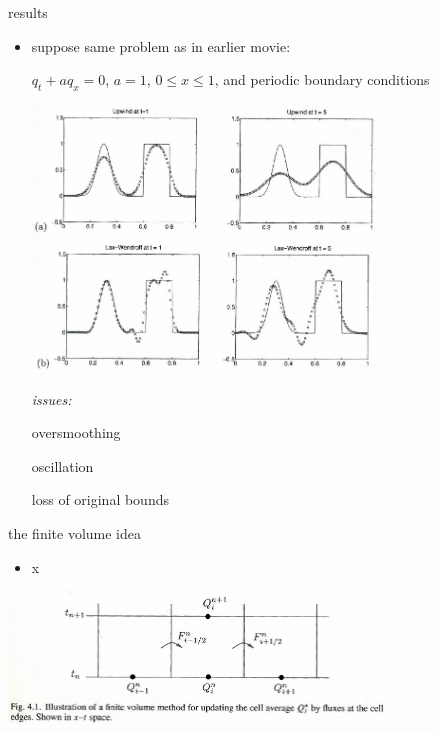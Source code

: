 \documentclass[10pt,hyperref]{beamer}
\begin{document}
\begin{frame}{results}

\begin{itemize}
\item suppose same problem as in earlier movie:

$q_t+a q_x=0$, $a=1$, $0\le x\le 1$, and periodic boundary conditions

\medskip
\hfill \includegraphics[width=0.72\textwidth]{figs/leveque6p1}

\vspace{-25mm}

\emph{issues:}

{\footnotesize oversmoothing}

{\footnotesize oscillation}

{\footnotesize loss of original bounds}
\end{itemize}
\end{frame}


\begin{frame}{the finite volume idea}

\begin{itemize}
\item x
\end{itemize}

\begin{center}
\includegraphics[width=0.75\textwidth]{figs/leveque4p1}
\end{center}
\end{frame}
\end{document}

